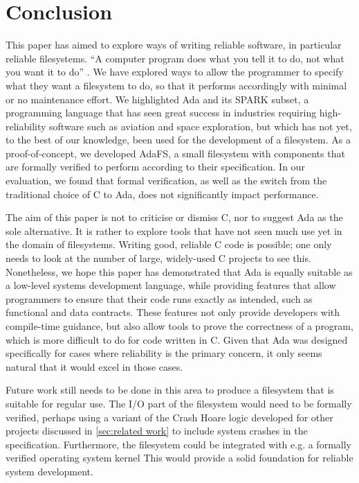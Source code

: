 \section{Conclusion}
This paper has aimed to explore ways of writing reliable software, in particular reliable filesystems.
``A computer program does what you tell it to do, not what you want it to do'' \cite{bloch1997}.
We have explored ways to allow the programmer to specify what they want a filesystem to do, so that it performs accordingly with minimal or no maintenance effort.
We highlighted Ada and its SPARK subset, a programming language that has seen great success in industries requiring high-reliability software such as aviation and space exploration, but which has not yet, to the best of our knowledge, been used for the development of a filesystem.
As a proof-of-concept, we developed AdaFS, a small filesystem with components that are formally verified to perform according to their specification.
In our evaluation, we found that formal verification, as well as the switch from the traditional choice of C to Ada, does not significantly impact performance.

The aim of this paper is not to criticise or dismiss C, nor to suggest Ada as the sole alternative.
It is rather to explore tools that have not seen much use yet in the domain of filesystems.
Writing good, reliable C code is possible; one only needs to look at the number of large, widely-used C projects to see this.
Nonetheless, we hope this paper has demonstrated that Ada is equally suitable as a low-level systems development language, while providing features that allow programmers to ensure that their code runs exactly as intended, such as functional and data contracts.
These features not only provide developers with compile-time guidance, but also allow tools to prove the correctness of a program, which is more difficult to do for code written in C.
Given that Ada was designed specifically for cases where reliability is the primary concern, it only seems natural that it would excel in those cases.

Future work still needs to be done in this area to produce a filesystem that is suitable for regular use.
The I/O part of the filesystem would need to be formally verified, perhaps using a variant of the Crash Hoare logic developed for other projects discussed in \autoref{sec:related work} to include system crashes in the specification.
Furthermore, the filesystem could be integrated with e.g. a formally verified operating system kernel \cite{king2019}
This would provide a solid foundation for reliable system development.
